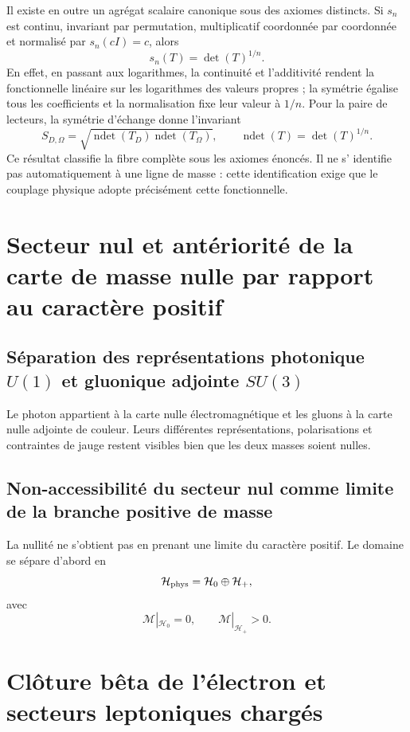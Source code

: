 Il existe en outre un agrégat scalaire canonique sous des axiomes distincts. Si
\(s_n\) est continu, invariant par permutation, multiplicatif coordonnée par
coordonnée et normalisé par \(s_n(cI)=c\), alors
\[
 s_n(T)=\det(T)^{1/n}.
\]
En effet, en passant aux logarithmes, la continuité et l'additivité rendent la
fonctionnelle linéaire sur les logarithmes des valeurs propres ; la symétrie égalise tous
les coefficients et la normalisation fixe leur valeur à \(1/n\). Pour la paire de
lecteurs, la symétrie d'échange donne l'invariant
\[
 S_{D,\Omega}
 =\sqrt{
 \operatorname{ndet}(T_D)\operatorname{ndet}(T_\Omega)},
 \qquad
 \operatorname{ndet}(T)=\det(T)^{1/n}.
\]
Ce résultat classifie la fibre complète sous les axiomes énoncés. Il ne s'
identifie pas automatiquement à une ligne de masse : cette identification exige
que le couplage physique adopte précisément cette fonctionnelle.

\section{Secteur nul et antériorité de la carte de masse nulle par rapport au caractère positif}

\subsection{Séparation des représentations photonique \texorpdfstring{\(U(1)\)}{U(1)} et gluonique adjointe \texorpdfstring{\(SU(3)\)}{SU(3)}}

Le photon appartient à la carte nulle électromagnétique et les gluons à la carte
nulle adjointe de couleur. Leurs différentes représentations, polarisations et
contraintes de jauge restent visibles bien que les deux masses soient nulles.

\subsection{Non-accessibilité du secteur nul comme limite de la branche positive de masse}

La nullité ne s'obtient pas en prenant une limite du caractère positif. Le domaine
se sépare d'abord en
\[
 \mathcal H_{\rm phys}=\mathcal H_0\oplus\mathcal H_+,
\]
avec
\[
 \mathcal M|_{\mathcal H_0}=0,
 \qquad
 \mathcal M|_{\mathcal H_+}>0.
\]

\section{Clôture bêta de l'électron et secteurs leptoniques chargés}

